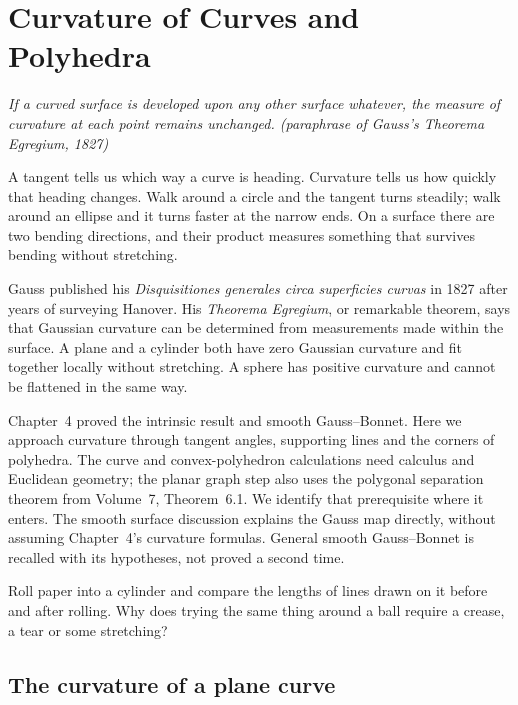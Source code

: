 \chapter{Curvature of Curves and Polyhedra}\label{geometry:ch:curvature}

\begin{center}\itshape
If a curved surface is developed upon any other surface whatever, the measure of curvature at each point remains unchanged.
\upshape(paraphrase of Gauss's \emph{Theorema Egregium}, 1827)
\end{center}

A tangent tells us which way a curve is heading. Curvature tells us how quickly that heading changes. Walk around a circle and the tangent turns steadily; walk around an ellipse and it turns faster at the narrow ends. On a surface there are two bending directions, and their product measures something that survives bending without stretching.

Gauss published his \emph{Disquisitiones generales circa superficies curvas} in 1827 after years of surveying Hanover. His \emph{Theorema Egregium}, or remarkable theorem, says that Gaussian curvature can be determined from measurements made within the surface. A plane and a cylinder both have zero Gaussian curvature and fit together locally without stretching. A sphere has positive curvature and cannot be flattened in the same way.

Chapter~4 proved the intrinsic result and smooth Gauss--Bonnet. Here we approach curvature through tangent angles, supporting lines and the corners of polyhedra. The curve and convex-polyhedron calculations need calculus and Euclidean geometry; the planar graph step also uses the polygonal separation theorem from Volume~7, Theorem~6.1. We identify that prerequisite where it enters. The smooth surface discussion explains the Gauss map directly, without assuming Chapter~4's curvature formulas. General smooth Gauss--Bonnet is recalled with its hypotheses, not proved a second time.

\begin{think}
Roll paper into a cylinder and compare the lengths of lines drawn on it before and after rolling. Why does trying the same thing around a ball require a crease, a tear or some stretching?
\end{think}

\section{The curvature of a plane curve}

